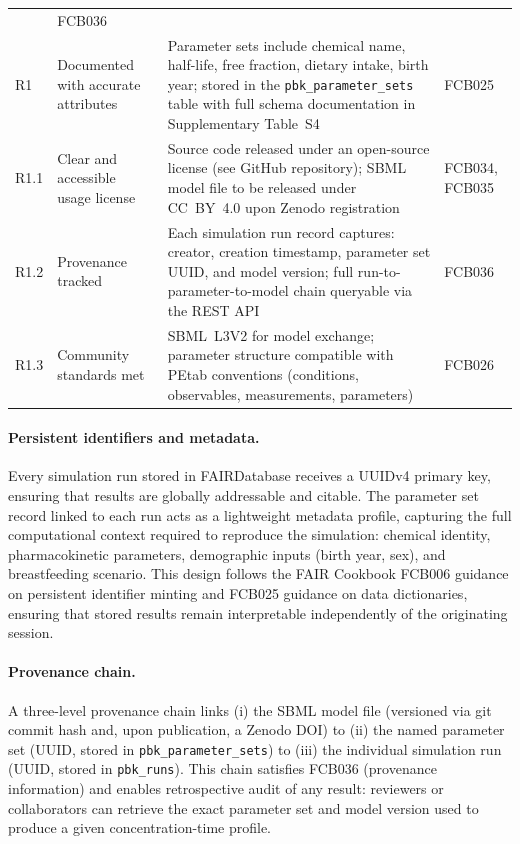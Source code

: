 \documentclass[preprint,12pt]{elsarticle}
\begin{document}
\begin{linenumbers}
\begin{table}[h]
\begin{tabular}{p{1.0cm} p{2.6cm} p{5.8cm} p{2.4cm}}
   & FCB036 \\[4pt]
R1 & Documented with accurate attributes
   & Parameter sets include chemical name, half-life, free fraction,
     dietary intake, birth year; stored in the \texttt{pbk\_parameter\_sets}
     table with full schema documentation in Supplementary Table~S4
   & FCB025 \\[4pt]
R1.1 & Clear and accessible usage license
   & Source code released under an open-source license (see GitHub
     repository); SBML model file to be released under CC~BY~4.0 upon
     Zenodo registration
   & FCB034, FCB035 \\[4pt]
R1.2 & Provenance tracked
   & Each simulation run record captures: creator, creation timestamp,
     parameter set UUID, and model version; full run-to-parameter-to-model
     chain queryable via the REST API
   & FCB036 \\[4pt]
R1.3 & Community standards met
   & SBML~L3V2 for model exchange; parameter structure
     compatible with PEtab conventions (conditions, observables,
     measurements, parameters)~\cite{schmiester2021}
   & FCB026 \\
\bottomrule
\end{tabular}
\end{table}

\paragraph{Persistent identifiers and metadata.}
Every simulation run stored in FAIRDatabase receives a UUIDv4 primary key,
ensuring that results are globally addressable and citable. The parameter
set record linked to each run acts as a lightweight metadata profile,
capturing the full computational context required to reproduce the
simulation: chemical identity, pharmacokinetic parameters, demographic
inputs (birth year, sex), and breastfeeding scenario. This design follows
the FAIR Cookbook FCB006 guidance on persistent identifier minting and
FCB025 guidance on data dictionaries, ensuring that stored results remain
interpretable independently of the originating session.

\paragraph{Provenance chain.}
A three-level provenance chain links (i) the SBML model file (versioned
via git commit hash and, upon publication, a Zenodo DOI) to (ii) the
named parameter set (UUID, stored in \texttt{pbk\_parameter\_sets}) to
(iii) the individual simulation run (UUID, stored in \texttt{pbk\_runs}).
This chain satisfies FCB036 (provenance information) and enables
retrospective audit of any result: reviewers or collaborators can
retrieve the exact parameter set and model version used to produce a
given concentration-time profile.


\end{linenumbers}
\end{document}
